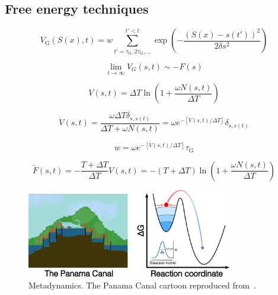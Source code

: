 \subsection{Free energy techniques}

\begin{equation}
V_{\text{G}}(S(x), t) = w \sum_{t' = \tau_{\text{G}}, 2\tau_{\text{G}}, \ldots}^{t' < t} \exp\left(-\frac{(S(x) - s(t'))^2}{2\delta s^2}\right)
\label{eq:biasing_potential}
\end{equation}

\begin{equation}
\label{eq:free_energy_from_metadynamics}
\lim_{t \to \infty} V_G(s,t) \sim -F(s)
\end{equation}

\begin{equation}
V(s, t) = \Delta T \ln\left(1 + \frac{\omega N(s, t)}{\Delta T}\right)
\label{eq:history_dependant_potential}
\end{equation}

\begin{equation}
\label{eq:hill_deposition_rate}
\dot{V}(s,t) = \frac{\omega \Delta T \delta_{s,s(t)}}{\Delta T + \omega N(s,t)} 
= \omega e^{-[V(s,t)/\Delta T]} \delta_{s,s(t)}
\end{equation}

\begin{equation}
w = \omega e^{-[V(s,t)/\Delta T]} \tau_{\text{G}}
\label{eq:hill_height}
\end{equation}

\begin{equation}
\label{eq:free_energy_surface_reconstruction}
\tilde{F}(s,t) = -\frac{T + \Delta T}{\Delta T} V(s,t) 
= -(T + \Delta T) \ln\left(1 + \frac{\omega N(s,t)}{\Delta T} \right)
\end{equation}

\begin{figure}[htbp]
    \centering
    \includegraphics[width=0.8\textwidth]{Figures/2_Theory/theory_metadynamics.png}
    \caption{Metadynamics. The Panama Canal cartoon reproduced from~\citep{HowPanamaCanal}.}
    \label{fig:metadynamics}
\end{figure}



